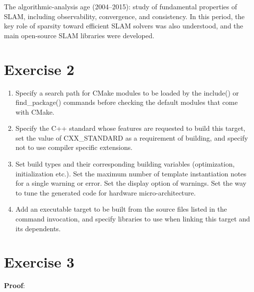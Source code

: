 \documentclass[a4paper, 12pt]{article}
\begin{document}
        The algorithmic-analysis age (2004–2015): study of fundamental properties of SLAM, including observability, convergence, and consistency. In this period, the key role of sparsity toward efficient SLAM solvers was also understood, and the main open-source SLAM libraries were developed.
        
    \pagebreak
    \section{Exercise 2}
    \begin{enumerate}
        \item Specify a search path for CMake modules to be loaded by the include() or find\_package() commands before checking the default modules that come with CMake.
        \item Specify the C++ standard whose features are requested to build this target, set the value of CXX\_STANDARD as a requirement of building, and specify not to use compiler specific extensions.
        \item Set build types and their corresponding building variables (optimization, initialization etc.). Set the maximum number of template instantiation notes for a single warning or error. Set the display option of warnings. Set the way to tune the generated code for hardware micro-architecture.
        \item Add an executable target to be built from the source files listed in the command invocation, and specify libraries to use when linking this target and its dependents.
    \end{enumerate}
    \section{Exercise 3}
    \textbf{Proof}:
    
\end{document}
